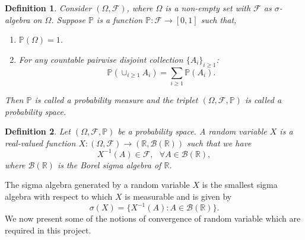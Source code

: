 \documentclass[12pt]{report}
\newtheorem{definition}{Definition}[section]
\begin{document}
\begin{definition}
Consider $(\Omega, \mathcal{F} )$, where $\Omega$ is a non-empty set with $\mathcal{F}$ as  $\sigma$-algebra on $\Omega$. Suppose $\mathbb{P}$ is a function $\mathbb{P}:\mathcal{F} \rightarrow [0,1]$ such that,
\begin{enumerate}
    \item $\mathbb{P}(\Omega)=1$.
    \item For any countable pairwise disjoint collection $\{A_i\}_{i \geq 1}$:
    $$\mathbb{P}(\cup_{i \geq 1} A_i)=\sum_{i \geq 1}\mathbb{P}(A_i).$$
\end{enumerate}
Then $\mathbb{P}$ is called a probability measure and the triplet $(\Omega,\mathcal{F},\mathbb{P})$ is called a probability space.

\end{definition}

\begin{definition}
Let  $(\Omega,\mathcal{F},\mathbb{P})$ be a probability space. A random variable $X$ is
a real-valued function $X:(\Omega,\mathcal{F}) \rightarrow (\mathbb{R},\mathcal{B}(\mathbb{R})) $ such that we have
$$X^{-1}(A) \in \mathcal{F}, ~~~\forall A \in \mathcal{B}(\mathbb{R}),$$
where $\mathcal{B}(\mathbb{R})$ is the Borel sigma algebra of $\mathbb{R}$.
\end{definition}
The sigma algebra generated by a random variable $X$ is the smallest sigma algebra with respect to which $X$ is measurable and is given by
$$\sigma(X) = \{X^{-1}(A): A \in \mathcal{B}(\mathbb{R}) \}.$$
We now present some of the notions of convergence of random variable which are required in this project.
\end{document}
